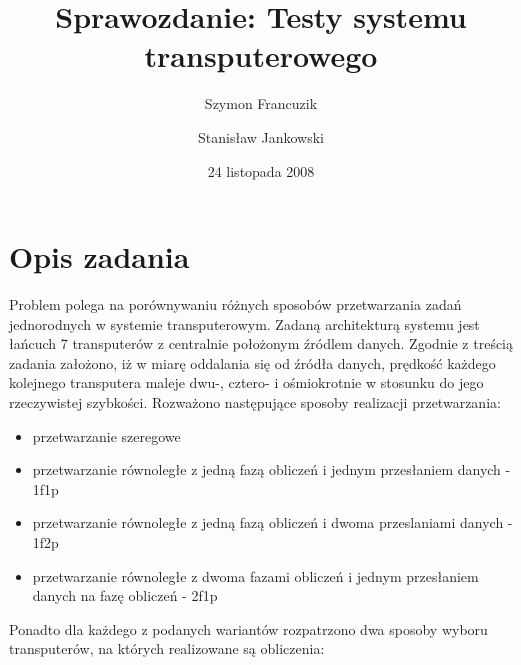 \documentclass[a4paper,11pt, titlepage]{article}
\title{Sprawozdanie: Testy systemu transputerowego}
\author{Szymon Francuzik\and
Stanisław Jankowski}
\date{24 listopada 2008}
\begin{document}
\maketitle
\section{Opis zadania}
Problem polega na porównywaniu różnych sposobów przetwarzania zadań jednorodnych w systemie transputerowym. Zadaną architekturą systemu jest łańcuch 7 transputerów z centralnie położonym źródlem danych. Zgodnie z treścią zadania założono, iż w miarę oddalania się od źródła danych, prędkość każdego kolejnego transputera maleje dwu-, cztero- i ośmiokrotnie w stosunku do jego rzeczywistej szybkości. Rozważono następujące sposoby realizacji przetwarzania:
\begin{itemize}
\item przetwarzanie szeregowe
\item przetwarzanie równoległe z jedną fazą obliczeń i jednym przesłaniem danych - 1f1p
\item przetwarzanie równoległe z jedną fazą obliczeń i dwoma przeslaniami danych - 1f2p
\item przetwarzanie równoległe z dwoma fazami obliczeń i jednym przesłaniem danych na fazę obliczeń - 2f1p
\end{itemize}
Ponadto dla każdego z podanych wariantów rozpatrzono dwa sposoby wyboru transputerów, na których realizowane są obliczenia:
\end{document}
